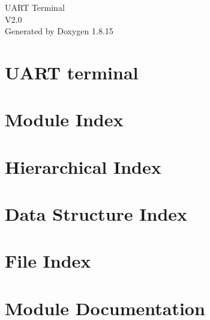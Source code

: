 \let\mypdfximage\pdfximage\def\pdfximage{\immediate\mypdfximage}\documentclass[twoside]{book}
\newcommand{\+}{\discretionary{\mbox{\scriptsize$\hookleftarrow$}}{}{}}
\newcommand{\clearemptydoublepage}{%
  \newpage{\pagestyle{empty}\cleardoublepage}%
}
\begin{document}
\begin{titlepage}
\vspace*{7cm}
\begin{center}%
{\Large U\+A\+RT Terminal \\[1ex]\large V2.\+0 }\\
\vspace*{1cm}
{\large Generated by Doxygen 1.8.15}\\
\end{center}
\end{titlepage}
\clearemptydoublepage
{}
\tableofcontents
\clearemptydoublepage
{}

\chapter{U\+A\+RT terminal}
\label{index}
\chapter{Module Index}

\chapter{Hierarchical Index}

\chapter{Data Structure Index}

\chapter{File Index}

\chapter{Module Documentation}





























\end{document}

